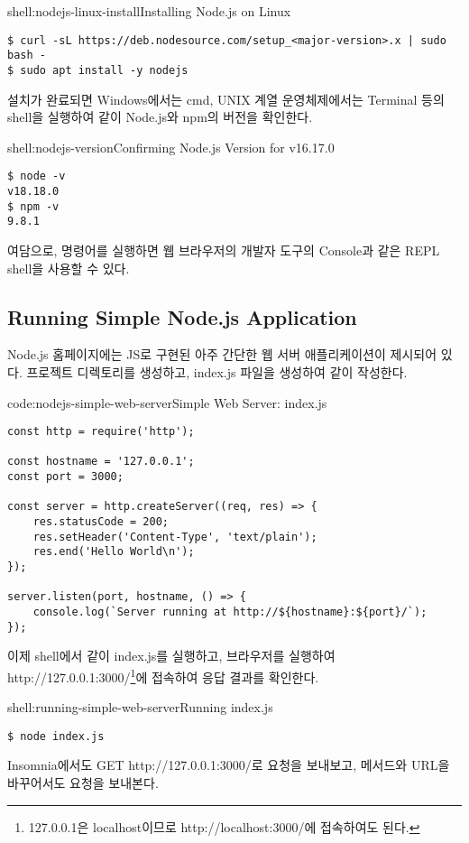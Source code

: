 \begin{shellenv}{shell:nodejs-linux-install}{Installing Node.js on Linux}\begin{verbatim}
$ curl -sL https://deb.nodesource.com/setup_<major-version>.x | sudo bash -
$ sudo apt install -y nodejs
\end{verbatim}
\end{shellenv}

설치가 완료되면 Windows에서는 cmd, UNIX 계열 운영체제에서는 Terminal 등의 shell을 실행하여 \과 같이 Node.js와 npm의 버전을 확인한다.

\begin{shellenv}{shell:nodejs-version}{Confirming Node.js Version for v16.17.0}\begin{verbatim}
$ node -v
v18.18.0
$ npm -v
9.8.1
\end{verbatim}
\end{shellenv}

여담으로,  명령어를 실행하면 웹 브라우저의 개발자 도구의 Console과 같은 REPL shell을 사용할 수 있다.

\subsection*{Running Simple Node.js Application}

Node.js 홈페이지에는 JS로 구현된 아주 간단한 웹 서버 애플리케이션이 제시되어 있다. 프로젝트 디렉토리를 생성하고, index.js 파일을 생성하여 \와 같이 작성한다.

\begin{codeenv}{code:nodejs-simple-web-server}{Simple Web Server: index.js}\begin{verbatim}
const http = require('http');

const hostname = '127.0.0.1';
const port = 3000;

const server = http.createServer((req, res) => {
    res.statusCode = 200;
    res.setHeader('Content-Type', 'text/plain');
    res.end('Hello World\n');
});

server.listen(port, hostname, () => {
    console.log(`Server running at http://${hostname}:${port}/`);
});
\end{verbatim}
\end{codeenv}

이제 shell에서 \와 같이 index.js를 실행하고, 브라우저를 실행하여 http://127.0.0.1:3000/\footnote{127.0.0.1은 localhost이므로 http://localhost:3000/에 접속하여도 된다.}에 접속하여 응답 결과를 확인한다.

\begin{shellenv}{shell:running-simple-web-server}{Running index.js}\begin{verbatim}
$ node index.js
\end{verbatim}
\end{shellenv}

Insomnia에서도 GET http://127.0.0.1:3000/로 요청을 보내보고, 메서드와 URL을 바꾸어서도 요청을 보내본다.

